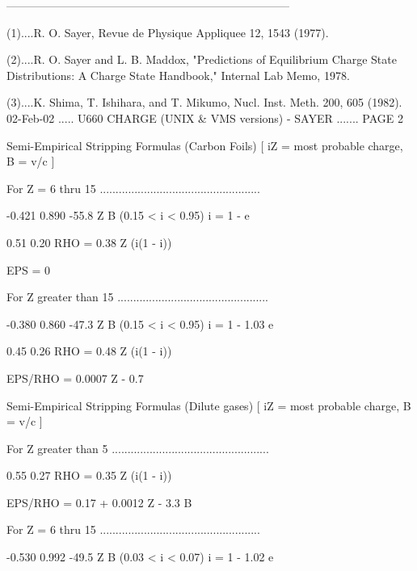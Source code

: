    ---------------------------------------------------------------------------
 
   (1)....R. O. Sayer, Revue de Physique Appliquee 12, 1543 (1977).
 
   (2)....R.  O.  Sayer  and  L. B. Maddox, "Predictions of Equilibrium Charge
          State Distributions:  A Charge State Handbook,"  Internal  Lab Memo,
          1978.
 
   (3)....K.  Shima,  T.  Ishihara,  and T. Mikumo, Nucl. Inst. Meth. 200, 605
          (1982).
    
   02-Feb-02 ..... U660  CHARGE (UNIX & VMS versions) - SAYER ....... PAGE   2
 
                Semi-Empirical Stripping Formulas (Carbon Foils)
                     [ iZ = most probable charge,  B = v/c ]
 
   For  Z  =  6  thru  15  ...................................................
 
                                  -0.421  0.890
                           -55.8 Z       B              (0.15 < i < 0.95)
                  i = 1 - e
 
                            0.51          0.20
                RHO = 0.38 Z    (i(1 - i))
 
                EPS = 0
 
   For  Z  greater than  15  ................................................
 
                                       -0.380  0.860
                                -47.3 Z       B         (0.15 < i < 0.95)
                  i = 1 - 1.03 e
 
                            0.45          0.26
                RHO = 0.48 Z    (i(1 - i))
 
            EPS/RHO = 0.0007 Z  -  0.7
 
 
 
                Semi-Empirical Stripping Formulas (Dilute gases)
                     [ iZ = most probable charge,  B = v/c ]
 
   For  Z  greater than  5  ..................................................
 
                            0.55          0.27
                RHO = 0.35 Z    (i(1 - i))
 
            EPS/RHO = 0.17 + 0.0012 Z  -  3.3 B
 
   For  Z  =  6  thru  15  ...................................................
 
                                       -0.530  0.992
                                -49.5 Z       B         (0.03 < i < 0.07)
                  i = 1 - 1.02 e
 
